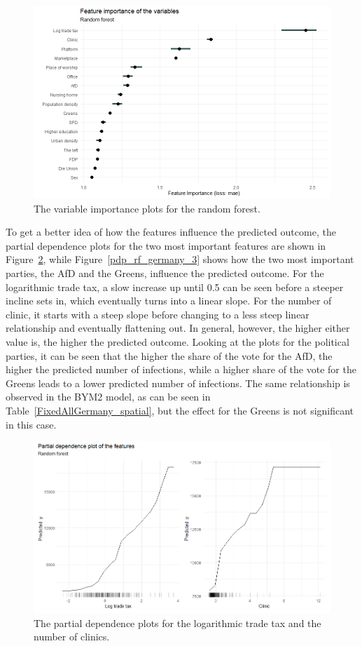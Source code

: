 \begin{figure}[H]
  \centering
  \includegraphics[width = \textwidth]{importance_rf_germany.png}
  \caption{The variable importance plots for the random forest.}
  \label{importance_rf_germany}
\end{figure}
To get a better idea of how the features influence the predicted outcome, the partial dependence plots for the two most important features are shown in Figure~\ref{pdp_rf_germany_1}, while Figure~\ref{pdp_rf_germany_3} shows how the two most important parties, the AfD and the Greens, influence the predicted outcome. For the logarithmic trade tax, a slow increase up until 0.5 can be seen before a steeper incline sets in, which eventually turns into a linear slope. For the number of clinic, it starts with a steep slope before changing to a less steep linear relationship and eventually flattening out. In general, however, the higher either value is, the higher the predicted outcome. Looking at the plots for the political parties, it can be seen that the higher the share of the vote for the AfD, the higher the predicted number of infections, while a higher share of the vote for the Greens leads to a lower predicted number of infections. The same relationship is observed in the BYM2 model, as can be seen in Table~\ref{FixedAllGermany_spatial}, but the effect for the Greens is not significant in this case.
\begin{figure}[H]
  \centering
  \includegraphics[width = \textwidth]{pdp_rf_germany_1.png}
  \caption{The partial dependence plots for the logarithmic trade tax and the number of clinics.}
  \label{pdp_rf_germany_1}
\end{figure}
